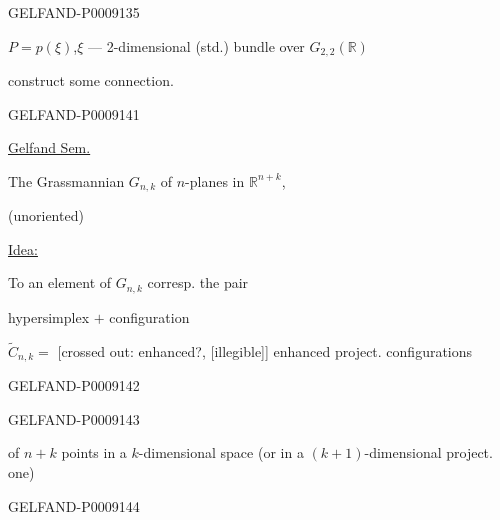 \begin{GelfandAdjacentEvidence}{GELFAND-P000913}{5}


$P=p(\xi)$,\qquad $\xi$ --- 2-dimensional (std.) bundle over $G_{2,2}(\mathbb R)$

construct some connection.
\end{GelfandAdjacentEvidence}



\begin{GelfandAdjacentEvidence}{GELFAND-P000914}{1}

\qquad\uline{Gelfand Sem.}


The Grassmannian $G_{n,k}$ of $n$-planes in $\mathbb R^{n+k}$,

(unoriented)

\uline{Idea:}

To an element of $G_{n,k}$ corresp. the pair

hypersimplex $+$ configuration

\(\widetilde C_{n,k}=\) [crossed out: enhanced?, [illegible]] enhanced project. configurations
\end{GelfandAdjacentEvidence}
\begin{GelfandAdjacentEvidence}{GELFAND-P000914}{2}


\end{GelfandAdjacentEvidence}
\begin{GelfandAdjacentEvidence}{GELFAND-P000914}{3}


of $n+k$ points in a $k$-dimensional space (or in a $(k+1)$-dimensional project. one)
\end{GelfandAdjacentEvidence}
\begin{GelfandAdjacentEvidence}{GELFAND-P000914}{4}


\end{GelfandAdjacentEvidence}



